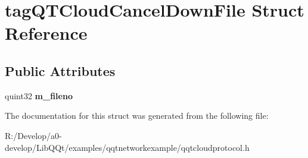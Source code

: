 \hypertarget{structtag_q_t_cloud_cancel_down_file}{}\section{tag\+Q\+T\+Cloud\+Cancel\+Down\+File Struct Reference}
\label{structtag_q_t_cloud_cancel_down_file}
\subsection*{Public Attributes}
\begin{DoxyCompactItemize}
\item 
\mbox{\label{structtag_q_t_cloud_cancel_down_file_ad875f3de31c4594a63c4ca06a9c23451}} 
quint32 {\bfseries m\+\_\+fileno}
\end{DoxyCompactItemize}


The documentation for this struct was generated from the following file\+:\begin{DoxyCompactItemize}
\item 
R\+:/\+Develop/a0-\/develop/\+Lib\+Q\+Qt/examples/qqtnetworkexample/qqtcloudprotocol.\+h\end{DoxyCompactItemize}
